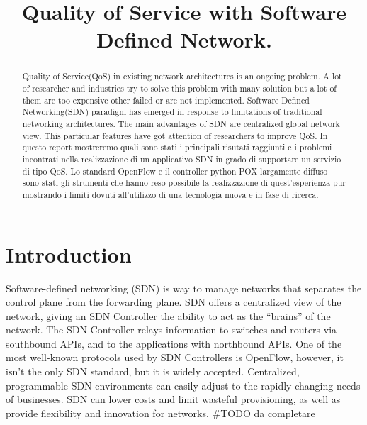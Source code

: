 \documentclass[conference,10pt]{IEEEtran}
\begin{document}
\title{Quality of Service with Software Defined Network.}

\author{
}

\maketitle

\begin{abstract}
Quality of Service(QoS) in existing network architectures is an ongoing problem.
A lot of researcher and industries try to solve this problem with many solution but a lot of them are too
expensive other failed or are not implemented.
Software Defined Networking(SDN) paradigm has emerged in response to limitations of traditional networking architectures.
The main advantages of SDN are centralized global network view. This particular features have got attention of researchers to improve QoS.
In questo report mostreremo quali sono stati i principali risutati raggiunti e i problemi incontrati nella realizzazione di
un applicativo SDN in grado di supportare un servizio di tipo QoS.
Lo standard OpenFlow e il controller python POX largamente diffuso sono stati gli strumenti che hanno reso possibile la
realizzazione di quest'esperienza pur mostrando i limiti dovuti all'utilizzo di una tecnologia nuova e in fase di ricerca.
\end{abstract}

\section{Introduction}\label{sec:intro}
Software-defined networking (SDN) is way to manage networks that separates the control plane from the forwarding plane.
SDN offers a centralized view of the network, giving an SDN Controller the ability to act as the “brains” of the network.
The SDN Controller relays information to switches and routers via southbound APIs, and to the applications with northbound APIs.
One of the most well-known protocols used by SDN Controllers is OpenFlow, however, it isn’t the only SDN standard, but it is widely accepted.
Centralized, programmable SDN environments can easily adjust to the rapidly changing needs of businesses. SDN can lower costs and limit
wasteful provisioning, as well as provide flexibility and innovation for networks.
\#TODO da completare
\end{document}
